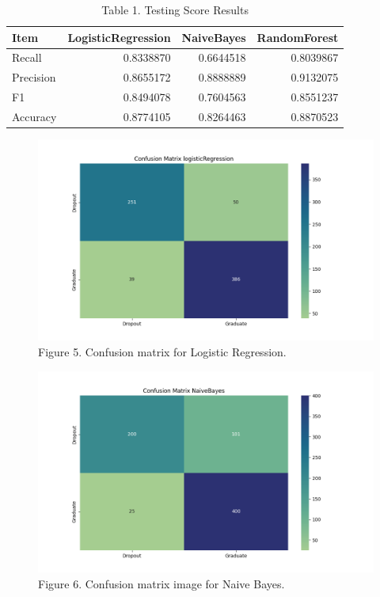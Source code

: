 \documentclass[
]{article}
\begin{document}
\begin{table}

\caption{\label{tab:load model test results}Table 1. Testing Score Results}
\centering
\begin{tabular}[t]{l|r|r|r}
\hline
Item & LogisticRegression & NaiveBayes & RandomForest\\
\hline
Recall & 0.8338870 & 0.6644518 & 0.8039867\\
\hline
Precision & 0.8655172 & 0.8888889 & 0.9132075\\
\hline
F1 & 0.8494078 & 0.7604563 & 0.8551237\\
\hline
Accuracy & 0.8774105 & 0.8264463 & 0.8870523\\
\hline
\end{tabular}
\end{table}

\begin{figure}
\includegraphics[width=1\linewidth]{../results/Confusion_Matrix_logisticRegression} \caption{Figure 5. Confusion matrix for Logistic Regression.}\label{fig:Confusion_Matrix_logisticRegression}
\end{figure}

\begin{figure}
\includegraphics[width=1\linewidth]{../results/Confusion_Matrix_NaiveBayes} \caption{Figure 6. Confusion matrix image for Naive Bayes.}\label{fig:Confusion_Matrix_NaiveBayes}
\end{figure}
\end{document}
